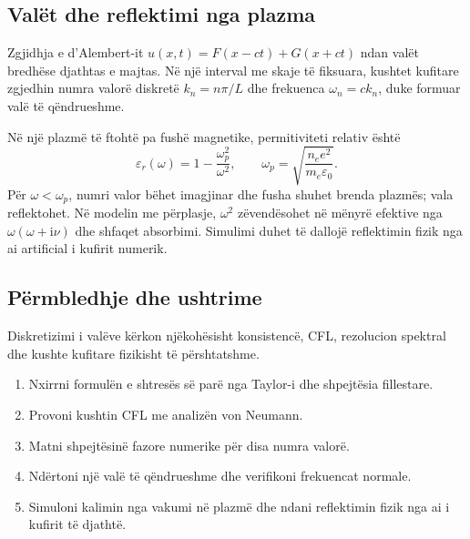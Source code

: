 \documentclass[11pt,oneside,openany]{book}
\begin{document}
\subsection{Valët dhe reflektimi nga plazma}
Zgjidhja e d'Alembert-it $u(x,t)=F(x-ct)+G(x+ct)$ ndan valët bredhëse djathtas e majtas. Në një interval me skaje të fiksuara, kushtet kufitare zgjedhin numra valorë diskretë $k_n=n\pi/L$ dhe frekuenca $\omega_n=ck_n$, duke formuar valë të qëndrueshme.

Në një plazmë të ftohtë pa fushë magnetike, permitiviteti relativ është
\begin{equation}
 \varepsilon_r(\omega)=1-\frac{\omega_p^2}{\omega^2},\qquad
 \omega_p=\sqrt{\frac{n_ee^2}{m_e\varepsilon_0}}.
\end{equation}
Për $\omega<\omega_p$, numri valor bëhet imagjinar dhe fusha shuhet brenda plazmës; vala reflektohet. Në modelin me përplasje, $\omega^2$ zëvendësohet në mënyrë efektive nga $\omega(\omega+\mathrm{i}\nu)$ dhe shfaqet absorbimi. Simulimi duhet të dallojë reflektimin fizik nga ai artificial i kufirit numerik.

\subsection{Përmbledhje dhe ushtrime}
Diskretizimi i valëve kërkon njëkohësisht konsistencë, CFL, rezolucion spektral dhe kushte kufitare fizikisht të përshtatshme.
\begin{enumerate}
\item Nxirrni formulën e shtresës së parë nga Taylor-i dhe shpejtësia fillestare.
\item Provoni kushtin CFL me analizën von Neumann.
\item Matni shpejtësinë fazore numerike për disa numra valorë.
\item Ndërtoni një valë të qëndrueshme dhe verifikoni frekuencat normale.
\item Simuloni kalimin nga vakumi në plazmë dhe ndani reflektimin fizik nga ai i kufirit të djathtë.
\end{enumerate}



\end{document}
